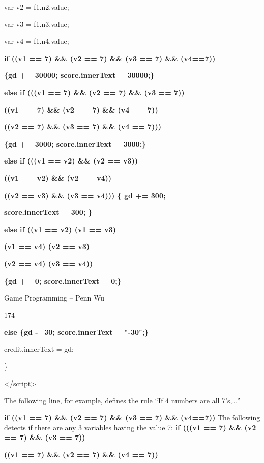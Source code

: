 \documentclass[
]{article}
\begin{document}
var v2 = f1.n2.value;

var v3 = f1.n3.value;

var v4 = f1.n4.value;

\textbf{if ((v1 == 7) \&\& (v2 == 7) \&\& (v3 == 7) \&\& (v4==7))}

\textbf{\{gd += 30000; score.innerText = 30000;\}}

\textbf{}

\textbf{else if (((v1 == 7) \&\& (v2 == 7) \&\& (v3 == 7))
\textbar\textbar{}}

\textbf{((v1 == 7) \&\& (v2 == 7) \&\& (v4 == 7)) \textbar\textbar{}}

\textbf{((v2 == 7) \&\& (v3 == 7) \&\& (v4 == 7)))}

\textbf{\{gd += 3000; score.innerText = 3000;\}}

\textbf{}

\textbf{else if (((v1 == v2) \&\& (v2 == v3)) \textbar\textbar{}}

\textbf{((v1 == v2) \&\& (v2 == v4)) \textbar\textbar{}}

\textbf{((v2 == v3) \&\& (v3 == v4))) \{ gd += 300;}

\textbf{score.innerText = 300; \}}

\textbf{}

\textbf{else if ((v1 == v2) \textbar\textbar{} (v1 == v3)
\textbar\textbar{}}

\textbf{(v1 == v4) \textbar\textbar{} (v2 == v3) \textbar\textbar{}}

\textbf{(v2 == v4) \textbar\textbar{} (v3 == v4))}

\textbf{\{gd += 0; score.innerText = 0;\}}

Game Programming -- Penn Wu

174

\protect\hypertarget{index_split_011.htmlux5cux23p175}{}{}\textbf{else
\{gd -=30; score.innerText = "-30";\}}

credit.innerText = gd;

\}

\textless/script\textgreater{}

The following line, for example, defines the rule ``If 4 numbers are all
7's,\ldots''

\textbf{if ((v1 == 7) \&\& (v2 == 7) \&\& (v3 == 7) \&\& (v4==7))} The
following detects if there are any 3 variables having the value 7:
\textbf{if (((v1 == 7) \&\& (v2 == 7) \&\& (v3 == 7))
\textbar\textbar{}}

\textbf{((v1 == 7) \&\& (v2 == 7) \&\& (v4 == 7)) \textbar\textbar{}}
\end{document}
